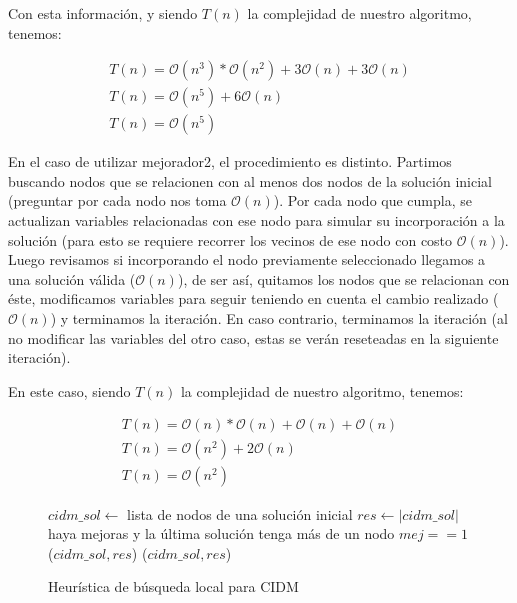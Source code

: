 Con esta información, y siendo $T(n)$ la complejidad de nuestro algoritmo, tenemos:

\begin{equation*}
\begin{array}{l}
T(n) = \mathcal{O}(n^3) * \mathcal{O}(n^2) + 3\mathcal{O}(n) + 3\mathcal{O}(n) \\
T(n) = \mathcal{O}(n^5) + 6\mathcal{O}(n) \\
T(n) = \mathcal{O}(n^5)
\end{array}
\end{equation*}

En el caso de utilizar mejorador2, el procedimiento es distinto. Partimos buscando nodos que se relacionen con al menos dos nodos de la solución inicial (preguntar por cada nodo nos toma $\mathcal{O}(n)$). Por cada nodo que cumpla, se actualizan variables relacionadas con ese nodo para simular su incorporación a la solución (para esto se requiere recorrer los vecinos de ese nodo con costo $\mathcal{O}(n)$). Luego revisamos si incorporando el nodo previamente seleccionado llegamos a una solución válida ($\mathcal{O}(n)$), de ser así, quitamos los nodos que se relacionan con éste, modificamos variables para seguir teniendo en cuenta el cambio realizado ($\mathcal{O}(n)$) y terminamos la iteración. En caso contrario, terminamos la iteración (al no modificar las variables del otro caso, estas se verán reseteadas en la siguiente iteración).

En este caso, siendo $T(n)$ la complejidad de nuestro algoritmo, tenemos:

\begin{equation*}
\begin{array}{l}
T(n) = \mathcal{O}(n) * \mathcal{O}(n) + \mathcal{O}(n) + \mathcal{O}(n)\\
T(n) = \mathcal{O}(n^2) + 2\mathcal{O}(n) \\
T(n) = \mathcal{O}(n^2)
\end{array}
\end{equation*}

\vspace*{0.3cm}

\begin{figure}
\begin{codebox}
\li $cidm\_sol \leftarrow$ lista de nodos de una solución inicial
\li $res \leftarrow |cidm\_sol|$
\li \While haya mejoras y la última solución tenga más de un nodo
\li \Do 
		\If $mej == 1$
\li 		{}($cidm\_sol,res$)
\li 		{}($cidm\_sol,res$)
		\End
	\End
\end{codebox}
\caption{Heurística de búsqueda local para CIDM}\label{code:busqueda}
\end{figure}


